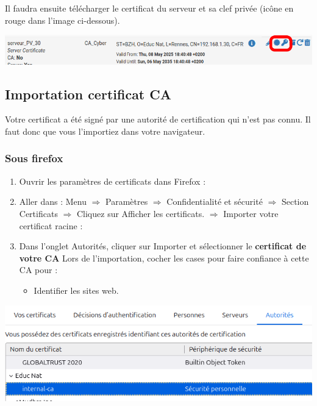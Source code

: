 \documentclass[french, 12pt]{article}%
\newcommand{\itemE}{\item[$\bullet$]}
\begin{document}
Il faudra ensuite télécharger le certificat du serveur et sa clef privée (icône en rouge dans l'image ci-dessous).
\begin{center}
\includegraphics[scale=0.5]{./ressource/certif_serveur}
\end{center}





\subsection{Importation certificat CA }
\label{lbl_importCA}
Votre certificat a été signé par une autorité de certification qui n'est pas connu. Il faut donc que vous l'importiez dans votre navigateur.

\subsubsection{Sous firefox}
\begin{enumerate}
\item Ouvrir les paramètres de certificats dans Firefox :
\item Aller dans :
Menu $\Rightarrow$ Paramètres  $\Rightarrow$  Confidentialité et sécurité  $\Rightarrow$ Section Certificats  $\Rightarrow$  Cliquez sur Afficher les certificats.  $\Rightarrow$ Importer votre certificat racine :
\item Dans l'onglet Autorités, cliquer sur Importer et sélectionner le  \textbf{certificat de votre CA}
Lors de l'importation, cocher les cases pour faire confiance à cette CA pour :
\begin{itemize}
\itemE Identifier les sites web.
\end{itemize}
\end{enumerate}

\begin{center}
\includegraphics[scale=0.7]{./ressource/newCA}
\end{center}
\end{document}

